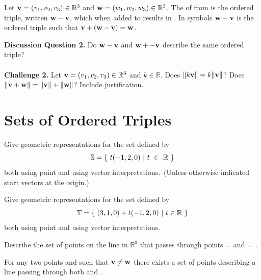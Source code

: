 \begin{defn}
 	Let $\mathbf{v}=({v_1},{v_2},{v_3}) \in \mathbb{R}^3$ and $\mathbf{w}=({w_1},{w_2},{w_3}) \in \mathbb{R}^3$. The  of  from  is the ordered triple, written $\mathbf{w}-\mathbf{v}$, which when added to  results in . In symbols $\mathbf{w}-\mathbf{v}$ is the ordered triple such that $\mathbf{v} +(\mathbf{w}-\mathbf{v})=\mathbf{w}$.
\end{defn}
 
 \noindent \textbf{Discussion Question 2.}  Do  $\mathbf{w}-\mathbf{v}$  and $\mathbf{w} + \mathbf{-v}$ describe the same ordered triple? 
 \\
 \\
 \noindent \textbf{Challenge 2.} Let $\mathbf{v}=({v_1},{v_2},{v_3}) \in \mathbb{R}^3$ and $k \in \mathbb{R}$. Does $\|k\mathbf{v}\| = k\|\mathbf{v}\|$? Does $\| \mathbf{v} + \mathbf{w}\| =\|\mathbf{v}\|+\|\mathbf{w}\|$? Include justification.
 
 \section{Sets of Ordered Triples}      \label{Sets of Ordered Triples} 
 
\begin{myexa}[\bd{a}]
 	Give geometric representations for the set defined by \[ \mathbb{S}=\{\ t\ot{-1}{2}{0} \ |\ t~\in~\mathbb{R}\ \} \] both using point and using vector interpretations.\  (Unless otherwise indicated start vectors at the origin.)
\end{myexa}
 
\begin{myexb}[\bd{b}]
 	Give geometric representations for the set defined by \[\mathbb{T} = \{\ \ot{3}{1}{0} + t\ot{-1}{2}{0}\ |\   t \in \mathbb{R}\ \}\] both using point and using vector interpretations. 
\end{myexb}
 
\begin{myexc}[\bd{c}]
 	Describe the set of points on the line in $\mathbb{R}^3$ that passes through points  =  and  = .
\end{myexc}
 
\begin{theorem}
 	For any two points  and  such that $\mathbf{v}\neq \mathbf{w}$ there exists a set of points describing a line passing through both  and .
\end{theorem}
\vspace{-.3in}\hspace{5in}\begin{annotation}
\end{annotation}
 
